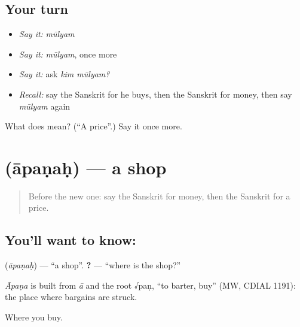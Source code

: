 \subsection*{Your turn}
\begin{itemize}
\raggedright
  \item \emph{Say it:} \emph{mūlyam}
  \item \emph{Say it:} \emph{mūlyam}, once more
  \item \emph{Say it:} ask \emph{kim mūlyam?}
  \item \emph{Recall:} say the Sanskrit for he buys, then the Sanskrit for money, then say \emph{mūlyam} again
\end{itemize}

\begin{tcolorbox}[breakable,colback=teal!4,colframe=teal!35!black,title={Before you move on}]
What does  mean? (\textquotedblleft{}A price\textquotedblright{}.) Say it once more.
\end{tcolorbox}
\section[\texorpdfstring{\sk{आपणः} (āpaṇaḥ)}{आपणः (āpaṇaḥ)}]{ (āpaṇaḥ) — a shop}

\label{lesson:SA-C74-shop}



\begin{quote}
Before the new one: say the Sanskrit for money, then the Sanskrit for a price.
\end{quote}

\subsection*{You'll want to know: }
\textbf{} (\emph{āpaṇaḥ}) — \textquotedblleft{}a shop\textquotedblright{}. \textbf{ ?} — \textquotedblleft{}where is the shop?\textquotedblright{}

\begin{cousinweb}
\emph{Āpaṇa} is built from \emph{ā} and the root √paṇ, \textquotedblleft{}to barter, buy\textquotedblright{} (MW, CDIAL 1191): the place where bargains are struck.
\end{cousinweb}

\begin{grammarlens}[title={What you've built}]
Where you buy.
\end{grammarlens}

